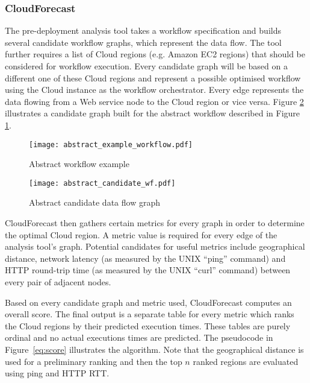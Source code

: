 \documentclass[10pt, conference, compsocconf]{IEEEtran}
\newcommand{\sysname}{CloudForecast\xspace}
\begin{document}
\subsubsection{\sysname}

The pre-deployment analysis tool takes a workflow specification and builds several candidate workflow graphs, which represent the data flow. The tool further requires a list of Cloud regions (e.g. Amazon EC2 regions) that should be considered for workflow execution. Every candidate graph will be based on a different one of these Cloud regions and represent a possible optimised workflow using the Cloud instance as the workflow orchestrator. Every edge represents the data flowing from a Web service node to the Cloud region or vice versa. Figure \ref{fig:abstract_candidate_wf_graph} illustrates a candidate graph built for the abstract workflow described in Figure \ref{fig:abstract_example_workflow}.

\begin{figure}[h]
\centering
\texttt{[image: abstract\_example\_workflow.pdf]}

\caption{Abstract workflow example}
\label{fig:abstract_example_workflow}
\end{figure}


\begin{figure}[h]
\centering
\texttt{[image: abstract\_candidate\_wf.pdf]}

\caption{Abstract candidate data flow graph}
\label{fig:abstract_candidate_wf_graph}
\end{figure}


\sysname then gathers certain metrics for every graph in order to determine the optimal Cloud region. A metric value is required for every edge of the analysis tool's graph. Potential candidates for useful metrics include geographical distance, network latency (as measured by the UNIX ``ping'' command) and HTTP round-trip time (as measured by the UNIX ``curl'' command) between every pair of adjacent nodes.


Based on every candidate graph and metric used, \sysname computes an overall score. The final output is a separate table for every metric which ranks the Cloud regions by their predicted execution times. These tables are purely ordinal and no actual executions times are predicted. The pseudocode in Figure~\ref{eq:score} illustrates the algorithm. Note that the geographical distance is used for a preliminary ranking and then the top $n$ ranked regions are evaluated using ping and HTTP RTT.
\end{document}
